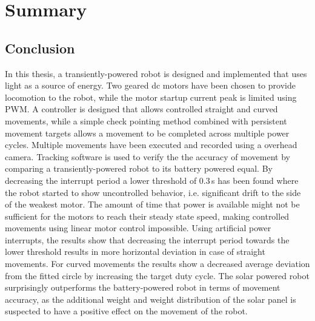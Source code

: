 \chapter{Summary}
\label{chp:summary}


\section{Conclusion}
\label{sec:conclusion}

In this thesis, a transiently-powered robot is designed and implemented that uses light as a source of energy.
Two geared dc motors have been chosen to provide locomotion to the robot, while the motor startup current peak is limited using PWM.
A controller is designed that allows controlled straight and curved movements, while a simple check pointing method combined with persistent movement targets allows a movement to be completed across multiple power cycles.
Multiple movements have been executed and recorded using a overhead camera.
Tracking software is used to verify the the accuracy of movement by comparing a transiently-powered robot to its battery powered equal.
By decreasing the interrupt period a lower threshold of 0.3\,s has been found where the robot started to show uncontrolled behavior, i.e. significant drift to the side of the weakest motor.
The amount of time that power is available might not be sufficient for the motors to reach their steady state speed, making controlled movements using linear motor control impossible.
Using artificial power interrupts, the results show that decreasing the interrupt period towards the lower threshold results in more horizontal deviation in case of straight movements.
For curved movements the results show a decreased average deviation from the fitted circle by increasing the target duty cycle.
The solar powered robot surprisingly outperforms the battery-powered robot in terms of movement accuracy, as the additional weight and weight distribution of the solar panel is suspected to have a positive effect on the movement of the robot.


